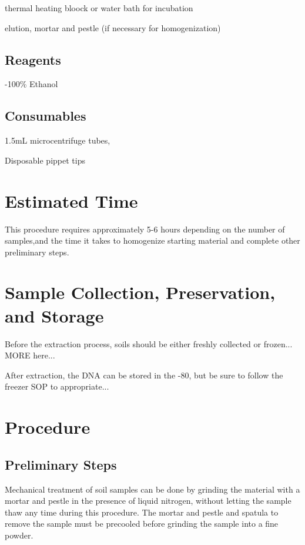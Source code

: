 \documentclass[12pt]{../SOP3_alpha}
\begin{document}
\NP thermal heating bloock or water bath for incubation

\NP elution, mortar and pestle (if necessary for homogenization)

\subsection*{Reagents}

-100\% Ethanol 

\subsection*{Consumables}

\NP 1.5mL microcentrifuge tubes, 

\NP Disposable pippet tips

\section{Estimated Time}

\NP This procedure requires approximately 5-6 hours depending on the number of samples,and the time it takes to homogenize starting material and complete other preliminary steps. 

\section{Sample Collection, Preservation, and Storage}

\NP Before the extraction process, soils should be either freshly collected or frozen... MORE here...

\NP After extraction, the DNA can be stored in the -80\degree, but be sure to follow the freezer SOP to appropriate...

\section{Procedure}

\subsection*{Preliminary Steps} 
 
\NP Mechanical treatment of soil samples can be done by grinding the material with a mortar and pestle in the presence of liquid nitrogen, without letting the sample thaw any time during this procedure. The mortar and pestle and spatula to remove the sample must be precooled before grinding the sample into a fine powder.
\end{document}

